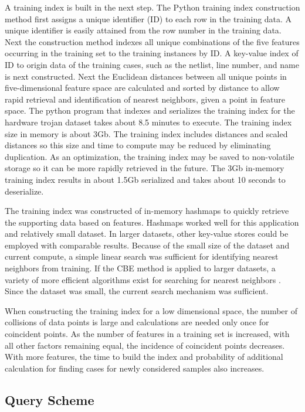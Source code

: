 A training index is built in the next step. The Python training index
construction method first assigns a unique identifier (ID) to each row in the
training data.  A unique identifier is easily attained from the row number in
the training data. Next the construction method indexes all unique combinations
of the five features occurring in the training set to the training instances by
ID. A key-value index of ID to origin data of the training cases, such as the
netlist, line number, and name is next constructed.  Next the Euclidean
distances between all unique points in five-dimensional feature space are
calculated and sorted by distance to allow rapid retrieval and identification of
nearest neighbors, given a point in feature space. The python program that
indexes and serializes the training index for the hardware trojan dataset takes
about 8.5 minutes to execute. The training index size in memory is about 3Gb.
The training index includes distances and scaled distances so this size and time
to compute may be reduced by eliminating duplication. As an optimization, the
training index may be saved to non-volatile storage so it can be more rapidly
retrieved in the future. The 3Gb in-memory training index results in about 1.5Gb
serialized and takes about 10 seconds to deserialize.

The training index was constructed of in-memory hashmaps to quickly retrieve the
supporting data based on features. Hashmaps worked well for this application and
relatively small dataset.  In larger datasets, other key-value stores could be
employed with comparable results.  Because of the small size of the dataset and
current compute, a simple linear search was sufficient for identifying nearest
neighbors from training. If the CBE method is applied to larger datasets, a
variety of more efficient algorithms exist for searching for nearest neighbors
\cite{615448, abbasifard2014survey}. Since the dataset was small, the current
search mechanism was sufficient.

When constructing the training index for a low dimensional space, the number of
collisions of data points is large and calculations are needed only once for
coincident points. As the number of features in a training set is increased,
with all other factors remaining equal, the incidence of coincident points
decreases. With more features, the time to build the index and probability of
additional calculation for finding cases for newly considered samples also
increases.

\subsection{Query Scheme}

